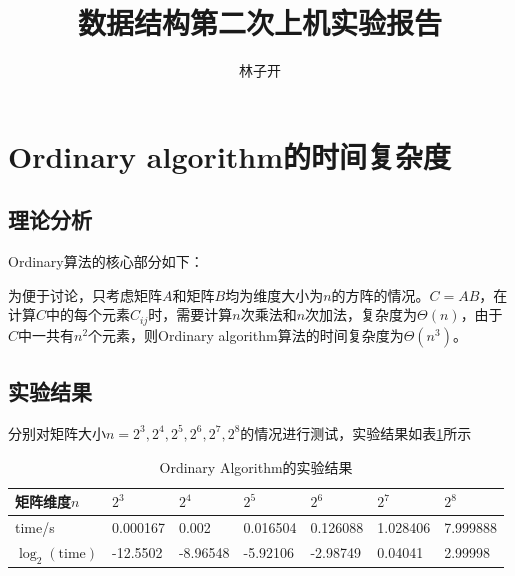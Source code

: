 \documentclass{article}
\title{数据结构第二次上机实验报告}
\author{林子开}
\begin{document}
	\maketitle
	\tableofcontents

\section{Ordinary algorithm的时间复杂度}
\subsection{理论分析}
Ordinary算法的核心部分如下：

 

\par 为便于讨论，只考虑矩阵$A$和矩阵$B$均为维度大小为$n$的方阵的情况。$C=AB$，在计算$C$中的每个元素$C_{ij}$时，需要计算$n$次乘法和$n$次加法，复杂度为$\Theta(n)$，由于$C$中一共有$n^2$个元素，则Ordinary algorithm算法的时间复杂度为$\Theta(n^3)$。

\subsection{实验结果}
分别对矩阵大小$n=2^3,2^4,2^5,2^6,2^7,2^8$的情况进行测试，实验结果如表\ref{ord-result}所示
\begin{table}[H]
	\centering
	\caption{Ordinary Algorithm的实验结果}
	\label{ord-result}
	\begin{tabular}{lllllll}
		\hline
		矩阵维度$n$         & $2^3$ & $2^4$ & $2^5$ & $2^6$ & $2^7$ & $2^8$ \\ \hline
		time/s     & 0.000167             & 0.002                & 0.016504             & 0.126088             & 1.028406             & 7.999888             \\
		$\log_2(\text{time})$ & -12.5502             & -8.96548             & -5.92106             & -2.98749             & 0.04041              & 2.99998              \\ 
		\hline
	\end{tabular}
\end{table}
\end{document}
